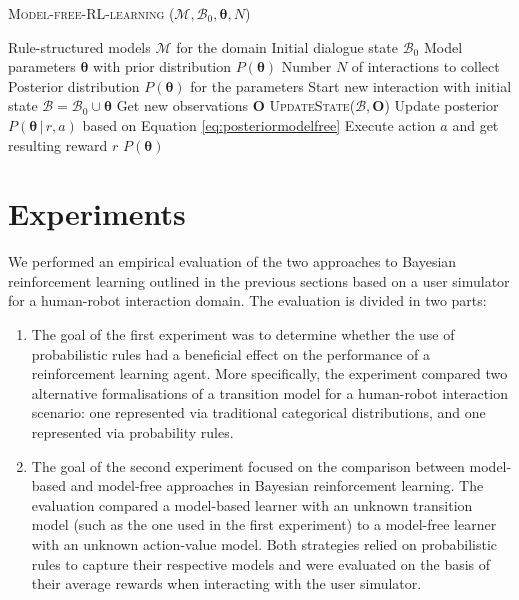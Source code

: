 \begin{algorithm}[h]
\caption{\textsc{Model-free-RL-learning} ($\mathcal{M}, \mathcal{B}_0, \boldsymbol\theta, N$)}
\begin{algorithmic}[1]\vspace{1mm}
\REQUIRE Rule-structured models $\mathcal{M}$ for the domain
\REQUIRE Initial dialogue state $\mathcal{B}_0$
\REQUIRE Model parameters $\boldsymbol\theta$ with prior distribution $P(\boldsymbol\theta)$
\REQUIRE Number $N$ of interactions to collect
\ENSURE Posterior distribution $P(\boldsymbol\theta)$ for the parameters  \vspace{1mm}
\STATE Start new interaction with initial state $\mathcal{B} = \mathcal{B}_0 \cup \boldsymbol\theta $
\STATE Get new observations $\mathbf{O}$
\STATE \textsc{UpdateState}($\mathcal{B}, \mathbf{O}$)
\STATE Update posterior $P(\boldsymbol\theta \, | \, r, a)$ based on Equation \eqref{eq:posteriormodelfree}
\STATE Execute action $a$ and get resulting reward $r$
\ENDIF
\ENDWHILE
\ENDFOR
\RETURN $P(\boldsymbol\theta)$
\end{algorithmic} 
\label{algo:rllearning_modelfree}
\end{algorithm}


\section{Experiments}
\label{sec:rllearning-experiments}

We performed an empirical evaluation of the two approaches to Bayesian reinforcement learning outlined in the previous sections based on a user simulator for a human-robot interaction domain. The evaluation is divided in two parts: 
\begin{enumerate}
\item The goal of the first experiment was to determine whether the use of probabilistic rules had a beneficial effect on the performance  of a reinforcement learning agent.  More specifically, the experiment compared two alternative formalisations of a transition model for a human-robot interaction scenario: one represented via traditional categorical distributions, and one represented via probability rules.  

\item The goal of the second experiment focused on the comparison between model-based and model-free approaches in Bayesian reinforcement learning. The evaluation compared a model-based learner with an unknown transition model (such as the one used in the first experiment) to a model-free learner with an unknown action-value model.  Both strategies relied on probabilistic rules to capture their respective models and were evaluated on the basis of their average rewards when interacting with the user simulator. 
\end{enumerate}

